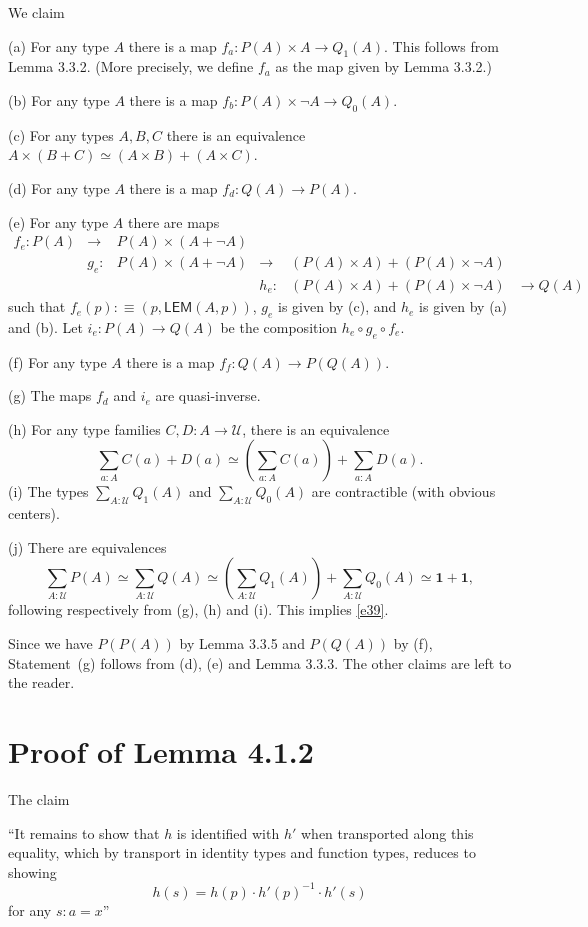 \documentclass[12pt]{article}
\newcommand{\mbf}{\mathbf}
\newcommand{\msf}{\mathsf}
\newcommand{\nn}{\noindent}
\newcommand{\U}{\mathcal U}
\begin{document}
We claim

\nn(a) For any type $A$ there is a map $f_a:P(A)\times A\to Q_1(A)$. This follows from Lemma 3.3.2. (More precisely, we define $f_a$ as the map given by Lemma 3.3.2.)

\nn(b) For any type $A$ there is a map $f_b:P(A)\times\neg A\to Q_0(A)$.

\nn(c) For any types $A,B,C$ there is an equivalence $A\times(B+C)\simeq(A\times B)+(A\times C)$.

\nn(d) For any type $A$ there is a map $f_d:Q(A)\to P(A)$.

\nn(e) For any type $A$ there are maps 
$$
\begin{matrix}
f_e:P(A)&\to &P(A)\times(A+\neg A)\\ 
        &g_e:&P(A)\times(A+\neg A)&\to &(P(A)\times A)+(P(A)\times\neg A)\\ 
        &    &                    &h_e:&(P(A)\times A)+(P(A)\times\neg A)&\to Q(A)
\end{matrix}
$$ 
such that $f_e(p):\equiv(p,\msf{LEM}(A,p))$, $g_e$ is given by (c), and $h_e$ is given by (a) and (b). Let $i_e:P(A)\to Q(A)$ be the composition $h_e\circ g_e\circ f_e$.

\nn(f) For any type $A$ there is a map $f_f:Q(A)\to P(Q(A))$.

\nn(g) The maps $f_d$ and $i_e$ are quasi-inverse.

\nn(h) For any type families $C,D:A\to\U$, there is an equivalence 
$$
\sum_{a:A}C(a)+D(a)\simeq\left(\sum_{a:A}C(a)\right)+\sum_{a:A}D(a).
$$
\nn(i) The types $\sum_{A:\U}Q_1(A)$ and $\sum_{A:\U}Q_0(A)$ are contractible (with obvious centers).

\nn(j) There are equivalences 
$$
\sum_{A:\U}P(A)\simeq\sum_{A:\U}Q(A)\simeq\left(\sum_{A:\U}Q_1(A)\right)+\sum_{A:\U}Q_0(A)\simeq\mbf1+\mbf1,
$$ 
following respectively from (g), (h) and (i). This implies \eqref{e39}.

Since we have $P(P(A))$ by Lemma 3.3.5 and $P(Q(A))$ by (f), Statement~(g) follows from (d), (e) and Lemma 3.3.3. The other claims are left to the reader.


\section{Proof of Lemma 4.1.2}

The claim

\nn ``It remains to show that $h$ is identified with $h'$ when transported along this equality, which by transport in identity types and function types, reduces to showing 
$$
h(s)=h(p)\cdot h'(p)^{-1}\cdot h'(s)
$$ 
for any $s:a=x$''
\end{document}
